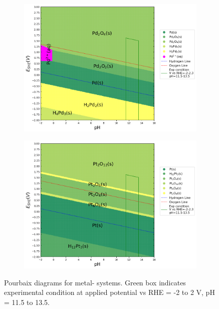 \documentclass[journal=jacsat,manuscript=article]{achemso}
\begin{document}
\begin{figure}[htbp]
    \begin{subfigure}[b]{0.3\textwidth}
        \includegraphics[width=\textwidth]{Figures/pourbaix_diagrams/Pd-NH3-H2O_activity=1e-04_[NH3]=0M_[Gly]=0M_[CN]=0.png}
        \subcaption{}\label{fig:Pd_Pourbaix_H2O}
    \end{subfigure}
    \begin{subfigure}[b]{0.3\textwidth}
        \includegraphics[width=\textwidth]{Figures/pourbaix_diagrams/Pt-NH3-H2O_activity=1e-04_[NH3]=0M_[Gly]=0M_[CN]=0.png}
        \subcaption{}\label{fig:Pt_Pourbaix_H2O}
    \end{subfigure}

    \caption{Pourbaix diagrams for metal- systems. Green box indicates experimental condition at applied potential vs RHE = -2 to 2 V, pH = 11.5 to 13.5.}
    \label{fig:Pourbaix_NH3_Gly}
\end{figure}
\end{document}
